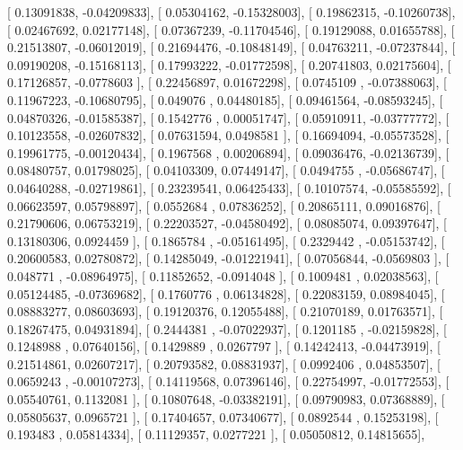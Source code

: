 \documentclass{article}
\begin{document}
       [ 0.13091838, -0.04209833],
       [ 0.05304162, -0.15328003],
       [ 0.19862315, -0.10260738],
       [ 0.02467692,  0.02177148],
       [ 0.07367239, -0.11704546],
       [ 0.19129088,  0.01655788],
       [ 0.21513807, -0.06012019],
       [ 0.21694476, -0.10848149],
       [ 0.04763211, -0.07237844],
       [ 0.09190208, -0.15168113],
       [ 0.17993222, -0.01772598],
       [ 0.20741803,  0.02175604],
       [ 0.17126857, -0.0778603 ],
       [ 0.22456897,  0.01672298],
       [ 0.0745109 , -0.07388063],
       [ 0.11967223, -0.10680795],
       [ 0.049076  ,  0.04480185],
       [ 0.09461564, -0.08593245],
       [ 0.04870326, -0.01585387],
       [ 0.1542776 ,  0.00051747],
       [ 0.05910911, -0.03777772],
       [ 0.10123558, -0.02607832],
       [ 0.07631594,  0.0498581 ],
       [ 0.16694094, -0.05573528],
       [ 0.19961775, -0.00120434],
       [ 0.1967568 ,  0.00206894],
       [ 0.09036476, -0.02136739],
       [ 0.08480757,  0.01798025],
       [ 0.04103309,  0.07449147],
       [ 0.0494755 , -0.05686747],
       [ 0.04640288, -0.02719861],
       [ 0.23239541,  0.06425433],
       [ 0.10107574, -0.05585592],
       [ 0.06623597,  0.05798897],
       [ 0.0552684 ,  0.07836252],
       [ 0.20865111,  0.09016876],
       [ 0.21790606,  0.06753219],
       [ 0.22203527, -0.04580492],
       [ 0.08085074,  0.09397647],
       [ 0.13180306,  0.0924459 ],
       [ 0.1865784 , -0.05161495],
       [ 0.2329442 , -0.05153742],
       [ 0.20600583,  0.02780872],
       [ 0.14285049, -0.01221941],
       [ 0.07056844, -0.0569803 ],
       [ 0.048771  , -0.08964975],
       [ 0.11852652, -0.0914048 ],
       [ 0.1009481 ,  0.02038563],
       [ 0.05124485, -0.07369682],
       [ 0.1760776 ,  0.06134828],
       [ 0.22083159,  0.08984045],
       [ 0.08883277,  0.08603693],
       [ 0.19120376,  0.12055488],
       [ 0.21070189,  0.01763571],
       [ 0.18267475,  0.04931894],
       [ 0.2444381 , -0.07022937],
       [ 0.1201185 , -0.02159828],
       [ 0.1248988 ,  0.07640156],
       [ 0.1429889 ,  0.0267797 ],
       [ 0.14242413, -0.04473919],
       [ 0.21514861,  0.02607217],
       [ 0.20793582,  0.08831937],
       [ 0.0992406 ,  0.04853507],
       [ 0.0659243 , -0.00107273],
       [ 0.14119568,  0.07396146],
       [ 0.22754997, -0.01772553],
       [ 0.05540761,  0.1132081 ],
       [ 0.10807648, -0.03382191],
       [ 0.09790983,  0.07368889],
       [ 0.05805637,  0.0965721 ],
       [ 0.17404657,  0.07340677],
       [ 0.0892544 ,  0.15253198],
       [ 0.193483  ,  0.05814334],
       [ 0.11129357,  0.0277221 ],
       [ 0.05050812,  0.14815655],
\end{document}
